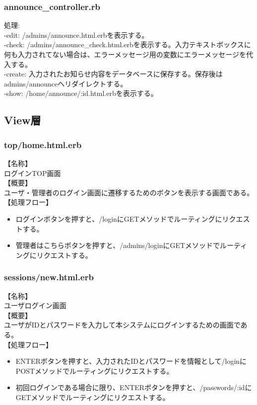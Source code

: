 \documentclass[a4j]{jarticle}
\begin{document}
\subsubsection{announce\_controller.rb}
\noindent
処理:  \\
-edit: /admins/announce.html.erbを表示する。\\
-check: /admins/announce\_check.html.erbを表示する。入力テキストボックスに何も入力されてない場合は、エラーメッセージ用の変数にエラーメッセージを代入する。\\
-create: 入力されたお知らせ内容をデータベースに保存する。保存後はadmins/announceへリダイレクトする。\\
-show: /home/announce/:id.html.erbを表示する。










\subsection{View層}


\subsubsection{top/home.html.erb}
\noindent
【名称】\\
ログインTOP画面\\
【概要】\\
ユーザ・管理者のログイン画面に遷移するためのボタンを表示する画面である。\\
【処理フロー】
\begin{itemize}
  \item ログインボタンを押すと、/loginにGETメソッドでルーティングにリクエストする。
  \item 管理者はこちらボタンを押すと、/admins/loginにGETメソッドでルーティングにリクエストする。
\end{itemize}

\subsubsection{sessions/new.html.erb}
\noindent
【名称】\\
ユーザログイン画面\\
【概要】\\
ユーザがIDとパスワードを入力して本システムにログインするための画面である。\\
【処理フロー】
\begin{itemize}
  \item ENTERボタンを押すと、入力されたIDとパスワードを情報として/loginにPOSTメソッドでルーティングにリクエストする。
  \item 初回ログインである場合に限り、ENTERボタンを押すと、/passwords/:idにGETメソッドでルーティングにリクエストする。
\end{itemize}
\end{document}

